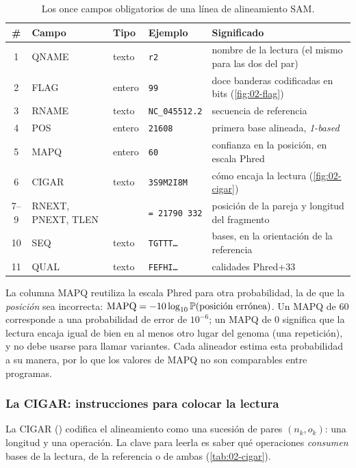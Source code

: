 \begin{table}[t]
\centering\small
\caption{Los once campos obligatorios de una línea de alineamiento SAM.}
\label{tab:02-sam}
\begin{tabularx}{\linewidth}{@{}clllX@{}}
\toprule
\textbf{\#} & \textbf{Campo} & \textbf{Tipo} & \textbf{Ejemplo} & \textbf{Significado}\\
\midrule
1 & QNAME & texto & \texttt{r2} & nombre de la lectura (el mismo para las dos del par)\\
2 & FLAG & entero & \texttt{99} & doce banderas codificadas en bits (\cref{fig:02-flag})\\
3 & RNAME & texto & \texttt{NC\_045512.2} & secuencia de referencia\\
4 & POS & entero & \texttt{21608} & primera base alineada, \emph{1-based}\\
5 & MAPQ & entero & \texttt{60} & confianza en la posición, en escala Phred\\
6 & CIGAR & texto & \texttt{3S9M2I8M} & cómo encaja la lectura (\cref{fig:02-cigar})\\
7--9 & RNEXT, PNEXT, TLEN & & \texttt{= 21790 332} & posición de la pareja y longitud del fragmento\\
10 & SEQ & texto & \texttt{TGTTT\ldots} & bases, en la orientación de la referencia\\
11 & QUAL & texto & \texttt{FEFHI\ldots} & calidades Phred+33\\
\bottomrule
\end{tabularx}
\end{table}

La columna MAPQ reutiliza la escala Phred para otra probabilidad, la de que la \emph{posición} sea incorrecta: $\mathrm{MAPQ} = -10\log_{10}\mathbb{P}(\text{posición errónea})$. Un MAPQ de 60 corresponde a una probabilidad de error de $10^{-6}$; un MAPQ de 0 significa que la lectura encaja igual de bien en al menos otro lugar del genoma (una repetición), y no debe usarse para llamar variantes. Cada alineador estima esta probabilidad a su manera, por lo que los valores de MAPQ no son comparables entre programas.

\subsubsection{La CIGAR: instrucciones para colocar la lectura}

La CIGAR () codifica el alineamiento como una sucesión de pares $(n_k, o_k)$: una longitud y una operación. La clave para leerla es saber qué operaciones \emph{consumen} bases de la lectura, de la referencia o de ambas (\cref{tab:02-cigar}).


